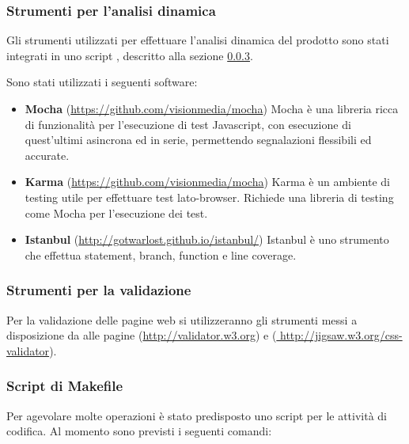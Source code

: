 		\subsubsection{Strumenti per l'analisi dinamica} 
		Gli strumenti utilizzati per effettuare l'analisi dinamica del prodotto sono stati
	integrati in uno script , descritto alla sezione \ref{makefile-codifica}.
		
		Sono stati utilizzati i seguenti software:
		\begin{itemize}
		\item \textbf{Mocha} (\url{https://github.com/visionmedia/mocha}) Mocha è una libreria ricca di funzionalità per l'esecuzione
		di test Javascript, con esecuzione di quest'ultimi asincrona ed in serie, permettendo segnalazioni flessibili ed accurate.
		\item \textbf{Karma} (\url{https://github.com/visionmedia/mocha}) Karma è un ambiente di testing utile per effettuare test lato-browser. Richiede una libreria di testing come Mocha per l'esecuzione dei test.
		\item \textbf{Istanbul} (\url{http://gotwarlost.github.io/istanbul/}) Istanbul è uno strumento che effettua statement, branch, function e line coverage.
		\end{itemize}
		
		\subsubsection{Strumenti per la validazione}
		
		Per la validazione delle pagine web si utilizzeranno gli strumenti messi a disposizione da  alle pagine 
		 (\url{http://validator.w3.org}) e (\url{ http://jigsaw.w3.org/css-validator}).			
		
		\subsubsection{Script di Makefile}
		\label{makefile-codifica}

Per agevolare molte operazioni è stato predisposto uno script  per le attività di codifica. Al momento sono previsti i seguenti comandi:

